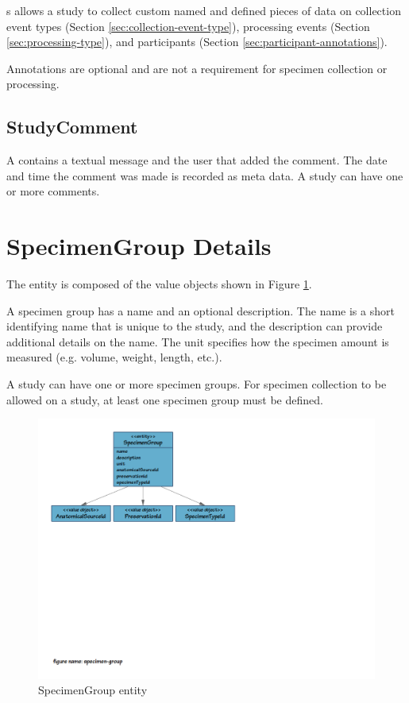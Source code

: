 s allows a study to collect custom named and
defined pieces of data on collection event types (Section
\ref{sec:collection-event-type}), processing events (Section
\ref{sec:processing-type}), and participants (Section
\ref{sec:participant-annotations}).

Annotations are optional and are not a requirement for specimen collection or
processing.

\subsection*{StudyComment}
A  contains a textual message and the user that
added the comment. The date and time the comment was made is recorded as meta
data. A study can have one or more comments.

\section{SpecimenGroup Details}
\label{sec:specimen-group}

The  entity is composed of the value objects shown
in Figure \ref{fig:specimen-group}.

A specimen group has a name and an optional description. The name is a short
identifying name that is unique to the study, and the description can provide
additional details on the name. The unit specifies how the specimen amount is
measured (e.g. volume, weight, length, etc.).

A study can have one or more specimen groups. For specimen collection to be
allowed on a study, at least one specimen group must be defined.

\begin{figure}[H]
  \centering
  \includegraphics[trim={9mm 130mm 80mm 9mm}, clip,
    width=1\textwidth]{images/specimen-group}
  \caption{SpecimenGroup entity}
  \label{fig:specimen-group}
\end{figure}


